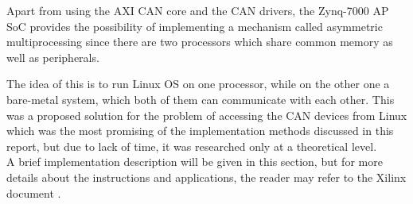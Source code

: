 Apart from using the AXI CAN core and the CAN drivers, the Zynq-7000 AP SoC provides the possibility of implementing a mechanism called asymmetric multiprocessing since there are two processors which share common memory as well as peripherals.\\

The idea of this is to run Linux OS on one processor, while on the other one a bare-metal system, which both of them can communicate with each other.
This was a proposed solution for the problem of accessing the CAN devices from Linux which was the most promising of the implementation methods discussed in this report, but due to lack of time, it was researched only at a theoretical level.
\\
A brief implementation description will be given in this section, but for more details about the instructions and applications, the reader may refer to the Xilinx document \cite{Xilinx_AMP}.

